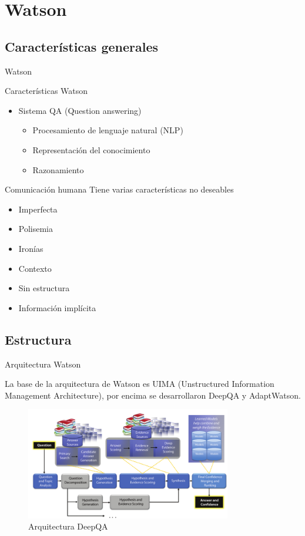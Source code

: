 \documentclass[compress]{beamer}
\begin{document}
\section{Watson}
\subsection{Características generales}
\begin{frame}{Watson}
	\begin{block}{Características Watson}
		\begin{itemize}
			\item Sistema QA (Question answering)
			\begin{itemize}
				\item Procesamiento
				de lenguaje natural (NLP)	
				\item Representación del conocimiento
				\item Razonamiento
			\end{itemize}
		\end{itemize}
	\end{block}
	\begin{block}{Comunicación humana}
		Tiene varias características no deseables
		\begin{itemize}
			\item Imperfecta
			\item Polisemia
			\item Ironías
			\item Contexto
			\item Sin estructura
			\item Información implícita
		\end{itemize}
	\end{block}
\end{frame}

\subsection{Estructura}
\begin{frame}{Arquitectura Watson}
	\begin{block}{ }
		La base de la arquitectura de Watson es UIMA (Unstructured Information Management Architecture), por encima se desarrollaron DeepQA y AdaptWatson.
	\end{block}
	\begin{figure}[H]
		\centering
		\label{tiw-deepqa}
		\includegraphics[width=0.8\textwidth]{./Imagenes/deepQA.png}
		\caption{Arquitectura DeepQA}
	\end{figure}
\end{frame}
\end{document}
